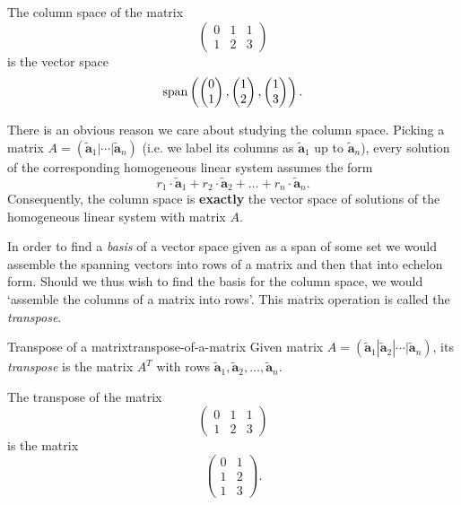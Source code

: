 \begin{example}{}{}
 The column space of the matrix
 \[
  \begin{pmatrix}
   0 & 1 & 1\\
   1 & 2 & 3
  \end{pmatrix}
 \]
 is the vector space
 \[
  \operatorname{span} \left( 
   \begin{pmatrix}
    0\\
    1
   \end{pmatrix},
   \begin{pmatrix}
    1\\
    2
   \end{pmatrix},
   \begin{pmatrix}
    1\\
    3
   \end{pmatrix}
  \right).
 \]
\end{example}

There is an obvious reason we care about studying the column space. Picking a
matrix $A = (\tilde{\mathbf{a}}_1 | \cdots | \tilde{\mathbf{a}}_n)$ (i.e. we
label its columns as $\tilde{\mathbf{a}}_1$ up to $\tilde{\mathbf{a}}_n$),
every solution of the corresponding homogeneous linear system assumes the form
\[
 r_1 \cdot \tilde{\mathbf{a}}_1 + r_2 \cdot \tilde{\mathbf{a}}_2 + \ldots +
 r_n \cdot \tilde{\mathbf{a}}_n.
\]
Consequently, the column space is \textbf{exactly} the vector space of
solutions of the homogeneous linear system with matrix $A$.

In order to find a \emph{basis} of a vector space given as a span of some set we
would assemble the spanning vectors into rows of a matrix and then that into
echelon form. Should we thus wish to find the basis for the column space, we
would `assemble the columns of a matrix into rows'. This matrix operation is
called the \emph{transpose}.

\begin{definition}{Transpose of a matrix}{transpose-of-a-matrix}
 Given matrix $A = (\tilde{\mathbf{a}}_1 | \tilde{\mathbf{a}}_2 | \cdots |
 \tilde{\mathbf{a}}_n)$, its \emph{transpose} is the matrix $A^{T}$ with rows
 $\tilde{\mathbf{a}}_1,\tilde{\mathbf{a}}_2,\ldots,\tilde{\mathbf{a}}_n$.
\end{definition}

\begin{example}{}{}
 The transpose of the matrix
 \[
  \begin{pmatrix}
   0 & 1 & 1\\
   1 & 2 & 3
  \end{pmatrix}
 \]
 is the matrix
 \[
  \begin{pmatrix}
   0 & 1\\
   1 & 2\\
   1 & 3
  \end{pmatrix}.
 \]
\end{example}

